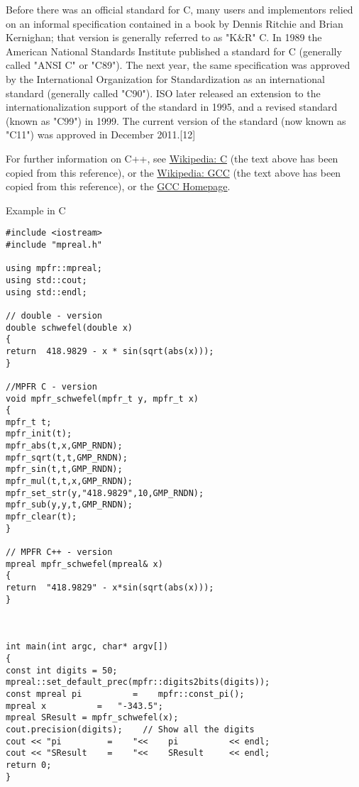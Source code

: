 \vpara
Before there was an official standard for C, many users and implementors relied on an informal specification contained in a book by Dennis Ritchie and Brian Kernighan; that version is generally referred to as "K\&R" C. In 1989 the American National Standards Institute published a standard for C (generally called "ANSI C" or "C89"). The next year, the same specification was approved by the International Organization for Standardization as an international standard (generally called "C90"). ISO later released an extension to the internationalization support of the standard in 1995, and a revised standard (known as "C99") in 1999. The current version of the standard (now known as "C11") was approved in December 2011.[12]


\vpara
For further information on C++, see \href{http://en.wikipedia.org/wiki/C_(programming_language)}{Wikipedia: C} (the text above has been copied from this reference), or the  \href{http://en.wikipedia.org/wiki/GNU_Compiler_Collection}{Wikipedia: GCC} (the text above has been copied from this reference), or the  \href{http://gcc.gnu.org/}{GCC Homepage}.



\vpara
Example in C


\begin{lstlisting}
#include <iostream>
#include "mpreal.h"

using mpfr::mpreal;    
using std::cout;
using std::endl;

// double - version
double schwefel(double x)
{
return  418.9829 - x * sin(sqrt(abs(x)));
}

//MPFR C - version
void mpfr_schwefel(mpfr_t y, mpfr_t x)
{
mpfr_t t;
mpfr_init(t);
mpfr_abs(t,x,GMP_RNDN);
mpfr_sqrt(t,t,GMP_RNDN);
mpfr_sin(t,t,GMP_RNDN);
mpfr_mul(t,t,x,GMP_RNDN);
mpfr_set_str(y,"418.9829",10,GMP_RNDN);
mpfr_sub(y,y,t,GMP_RNDN);
mpfr_clear(t);
}

// MPFR C++ - version
mpreal mpfr_schwefel(mpreal& x)
{
return  "418.9829" - x*sin(sqrt(abs(x)));
}



int main(int argc, char* argv[])
{
const int digits = 50; 
mpreal::set_default_prec(mpfr::digits2bits(digits));
const mpreal pi          =    mpfr::const_pi();
mpreal x          =   "-343.5"; 
mpreal SResult = mpfr_schwefel(x);
cout.precision(digits);    // Show all the digits
cout << "pi         =    "<<    pi          << endl;    
cout << "SResult    =    "<<    SResult     << endl;   
return 0;
}
\end{lstlisting}




